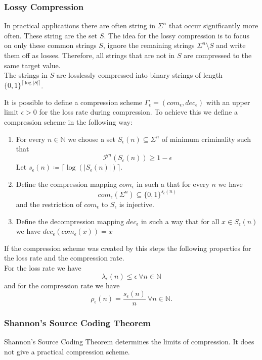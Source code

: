 \documentclass{panikzettel}
\begin{document}
\subsubsection{Lossy Compression}
In practical applications there are often string in $\Sigma^n$ that occur significantly more often. These string are the set $S$. The idea for the lossy compression is to focus on only these common strings $S$, ignore the remaining strings $\Sigma^n \setminus S$ and write them off as losses. Therefore, all strings that are not in $S$ are compressed to the same target value.\\
The strings in $S$ are losslessly compressed into binary strings of length $\{0,1 \}^{\lceil\log |S| \rceil}$.

It is possible to define a compression scheme $\Gamma_\epsilon=(com_\epsilon, dec_\epsilon)$ with an upper limit $\epsilon>0$ for the loss rate during compression. To achieve this we define a compression scheme in the following way:
\begin{enumerate}
\item For every $n\in\mathbb{N}$ we choose a set $S_\epsilon(n)\subseteq \Sigma^n$ of minimum criminality such that
\[
\mathcal{P}^n(S_\epsilon (n))\geq 1-\epsilon
\]
Let $s_\epsilon(n) \coloneqq \lceil\log (|S_\epsilon(n)|)\rceil$.
\item Define the compression mapping $com_\epsilon$ in such a that for every $n$ we have
\[
com_\epsilon(\Sigma^n)\subseteq \{0,1\}^{s_\epsilon(n)}
\]
and the restriction of $com_\epsilon$ to $S_\epsilon$ is injective.
\item Define the decompression mapping $dec_\epsilon$ in such a way that for all $x\in S_\epsilon(n)$ we have $dec_\epsilon(com_\epsilon(x))=x$
\end{enumerate}

If the compression scheme was created by this steps the following properties for the loss rate and the compression rate.\\
For the loss rate we have
\[
\lambda_\epsilon(n)\leq \epsilon \ \forall n\in\mathbb{N}
\]
and for the compression rate we have
\[
\rho_\epsilon(n)=\frac{s_\epsilon(n)}{n} \ \forall n\in\mathbb{N}.
\]


\subsubsection{Shannon’s Source Coding Theorem}
Shannon’s Source Coding Theorem determines the limits of compression. It does not give a practical compression scheme.
\end{document}
